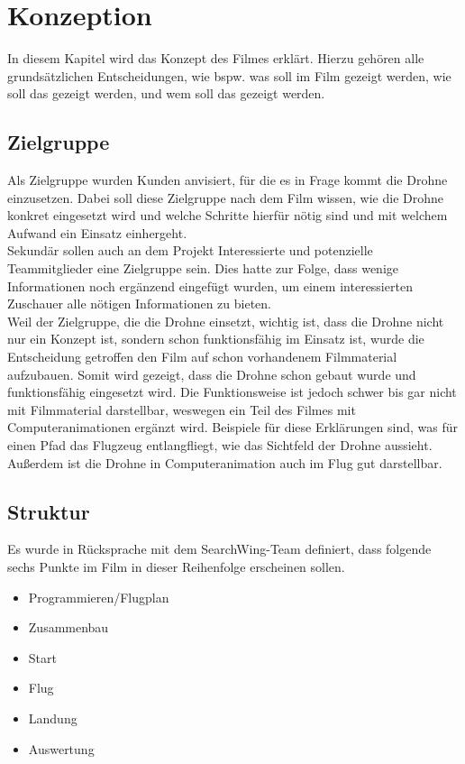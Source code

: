 \chapter{Konzeption}
\label{ch:intro}
In diesem Kapitel wird das Konzept des Filmes erklärt. Hierzu gehören alle grundsätzlichen Entscheidungen, wie bspw. was soll im Film gezeigt werden, wie soll das gezeigt werden, und wem soll das gezeigt werden.

\section{Zielgruppe}
\label{sec:konzept:zielgruppe}


Als Zielgruppe wurden Kunden anvisiert, für die es in Frage kommt die Drohne einzusetzen. Dabei soll diese Zielgruppe nach dem Film wissen, wie die Drohne konkret eingesetzt wird und welche Schritte hierfür nötig sind und mit welchem Aufwand ein Einsatz einhergeht.\\
Sekundär sollen auch an dem Projekt Interessierte und potenzielle Teammitglieder eine Zielgruppe sein. Dies hatte zur Folge, dass wenige Informationen noch ergänzend eingefügt wurden, um einem interessierten Zuschauer alle nötigen Informationen zu bieten.\\
Weil der Zielgruppe, die die Drohne einsetzt, wichtig ist, dass die Drohne nicht nur ein Konzept ist, sondern schon funktionsfähig im Einsatz ist, wurde die Entscheidung getroffen den Film auf schon vorhandenem Filmmaterial aufzubauen. Somit wird gezeigt, dass die Drohne schon gebaut wurde und funktionsfähig eingesetzt wird. Die Funktionsweise ist jedoch schwer bis gar nicht mit Filmmaterial darstellbar, weswegen ein Teil des Filmes mit Computeranimationen ergänzt wird. Beispiele für diese Erklärungen sind, was für einen Pfad das Flugzeug entlangfliegt, wie das Sichtfeld der Drohne aussieht. Außerdem ist die Drohne in Computeranimation auch im Flug gut darstellbar.

\section{Struktur} %
\label{sec:konzept:outline}

Es wurde in Rücksprache mit dem SearchWing-Team definiert, dass folgende sechs Punkte im Film in dieser Reihenfolge erscheinen sollen.

\begin{itemize}
\item{Programmieren/Flugplan}
\item{Zusammenbau}
\item{Start}
\item{Flug}
\item{Landung}
\item{Auswertung}
\end{itemize}

